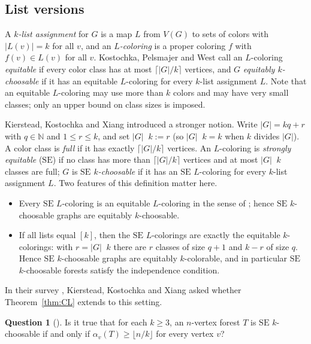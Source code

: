 \documentclass[11pt]{article}
\theoremstyle{definition}
\newtheorem{question}[theorem]{Question}
\newcommand{\SE}{\mathrm{SE}}
\newcommand{\N}{\mathbb{N}}
\DeclareMathOperator{\modstar}{mod^{*}}
\begin{document}
\subsection*{List versions}
A \emph{$k$-list assignment} for $G$ is a map $L$ from $V(G)$ to sets of colors with
$|L(v)|=k$ for all $v$, and an \emph{$L$-coloring} is a proper coloring $f$ with
$f(v)\in L(v)$ for all $v$. Kostochka, Pelsmajer and West \cite{KPW} call an $L$-coloring
\emph{equitable} if every color class has at most $\lceil |G|/k\rceil$ vertices, and $G$
\emph{equitably $k$-choosable} if it has an equitable $L$-coloring for every $k$-list
assignment $L$. Note that an equitable $L$-coloring may use more than $k$ colors and may
have very small classes; only an upper bound on class sizes is imposed.

Kierstead, Kostochka and Xiang \cite{KKXplanar,KKXsparse} introduced a stronger notion.
Write $|G|=kq+r$ with $q\in\N$ and $1\le r\le k$, and set $|G|\modstar k:=r$ (so
$|G|\modstar k=k$ when $k$ divides $|G|$). A color class is \emph{full} if it has exactly
$\lceil |G|/k\rceil$ vertices. An $L$-coloring is \emph{strongly equitable} ($\SE$) if no
class has more than $\lceil |G|/k\rceil$ vertices and at most $|G|\modstar k$ classes are
full; $G$ is \emph{$\SE$ $k$-choosable} if it has an $\SE$ $L$-coloring for every $k$-list
assignment $L$. Two features of this definition matter here.
\begin{itemize}
\item Every $\SE$ $L$-coloring is an equitable $L$-coloring in the sense of \cite{KPW};
  hence $\SE$ $k$-choosable graphs are equitably $k$-choosable.
\item If all lists equal $[k]$, then the $\SE$ $L$-colorings are exactly the equitable
  $k$-colorings: with $r=|G|\modstar k$ there are $r$ classes of size $q+1$ and $k-r$ of
  size $q$. Hence $\SE$ $k$-choosable graphs are equitably $k$-colorable, and in particular
  $\SE$ $k$-choosable forests satisfy the independence condition.
\end{itemize}
In their survey \cite[Question~13]{KKXsurvey}, Kierstead, Kostochka and Xiang asked
whether Theorem~\ref{thm:CL} extends to this setting.

\begin{question}[\cite{KKXsurvey}]\label{q13}
Is it true that for each $k\ge 3$, an $n$-vertex forest $T$ is $\SE$ $k$-choosable if and
only if $\alpha_v(T)\ge\lfloor n/k\rfloor$ for every vertex $v$?
\end{question}
\end{document}
